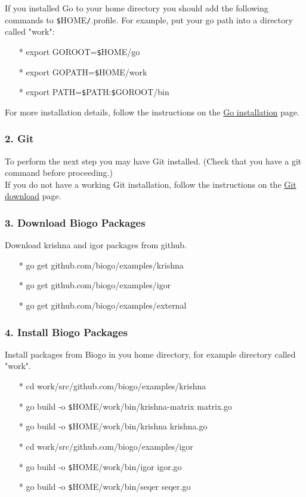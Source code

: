 \documentclass[12pt]{report}
\begin{document}
\noindent If you installed Go to your home directory you should add the following commands to \texttt{\$}HOME\texttt{/}.profile. For example, put your go path into a directory called "work":

\begin{enumerate}
	\item[*] export GOROOT=\texttt{\$}HOME/go
	\item[*] export GOPATH=\texttt{\$}HOME/work
	\item[*] export PATH=\texttt{\$}PATH:\texttt{\$}GOROOT/bin
	
\end{enumerate}

For more installation details, follow the instructions on the \href{https://golang.org/doc/install#install} {\color{blue}Go installation} page.


\subsubsection{2. Git}
To perform the next step you may have Git installed. (Check that you have a git command before proceeding.) \\

If you do not have a working Git installation, follow the instructions on the \href{https://git-scm.com/downloads}{\color{blue}Git download} page.

\subsubsection{3. Download Biogo Packages}
Download krishna and igor packages from github.

\begin{enumerate}
\item[*] go get github.com/biogo/examples/krishna
\item[*] go get github.com/biogo/examples/igor
\item[*] go get github.com/biogo/examples/external
\end{enumerate}

\subsubsection{4. Install Biogo Packages}
Install packages from Biogo in you home directory, for example directory called "work".
\begin{enumerate}
	\item[*] cd work/src/github.com/biogo/examples/krishna
	\item[*] go build -o \texttt{\$}HOME/work/bin/krishna-matrix matrix.go
	\item[*] go build -o \texttt{\$}HOME/work/bin/krishna krishna.go
	\item[*] cd work/src/github.com/biogo/examples/igor
	\item[*] go build -o \texttt{\$}HOME/work/bin/igor igor.go
	\item[*] go build -o \texttt{\$}HOME/work/bin/seqer seqer.go
\end{enumerate}
\end{document}
